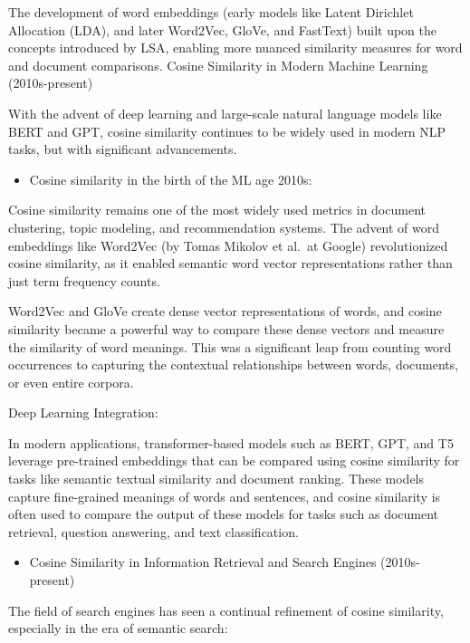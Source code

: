 \documentclass[
  12 pt,
  a4paper,
]{book}
\providecommand{\tightlist}{%
  \setlength{\itemsep}{0pt}\setlength{\parskip}{0pt}}
\numberwithin{equation}{section}
\theoremstyle{plain}      %
\theoremstyle{definition} %
\theoremstyle{remark}     %
\theoremstyle{note}         %
\begin{document}
The development of word embeddings (early models like Latent Dirichlet
Allocation (LDA), and later Word2Vec, GloVe, and FastText) built upon
the concepts introduced by LSA, enabling more nuanced similarity
measures for word and document comparisons. Cosine Similarity in Modern
Machine Learning (2010s-present)

With the advent of deep learning and large-scale natural language models
like BERT and GPT, cosine similarity continues to be widely used in
modern NLP tasks, but with significant advancements.

\begin{itemize}
\tightlist
\item
  Cosine similarity in the birth of the ML age 2010s:
\end{itemize}

Cosine similarity remains one of the most widely used metrics in
document clustering, topic modeling, and recommendation systems. The
advent of word embeddings like Word2Vec (by Tomas Mikolov et al.~at
Google) revolutionized cosine similarity, as it enabled semantic word
vector representations rather than just term frequency counts.

Word2Vec and GloVe create dense vector representations of words, and
cosine similarity became a powerful way to compare these dense vectors
and measure the similarity of word meanings. This was a significant leap
from counting word occurrences to capturing the contextual relationships
between words, documents, or even entire corpora.

Deep Learning Integration:

In modern applications, transformer-based models such as BERT, GPT, and
T5 leverage pre-trained embeddings that can be compared using cosine
similarity for tasks like semantic textual similarity and document
ranking. These models capture fine-grained meanings of words and
sentences, and cosine similarity is often used to compare the output of
these models for tasks such as document retrieval, question answering,
and text classification.

\begin{itemize}
\tightlist
\item
  Cosine Similarity in Information Retrieval and Search Engines
  (2010s-present)
\end{itemize}

The field of search engines has seen a continual refinement of cosine
similarity, especially in the era of semantic search:
\end{document}
